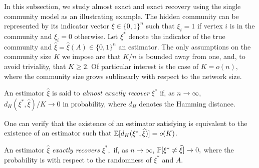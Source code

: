 In this subsection, we study almost exact and exact recovery using the single community model
as an illustrating example. The hidden community can be represented by its indicator vector $\xi \in \{0, 1\}^n$
such that $\xi_i=1$ if vertex $i$ is in the community and $\xi_i=0$ otherwise. 
Let $\xi^*$ denote the indicator of the true community 
and $\hat\xi=\hat\xi(A) \in \{0,1\}^n$ an estimator.
The only assumptions on the community size $K$ we impose are that $K/n$ is bounded away from one,
and, to avoid triviality, that $K\geq 2$.  Of particular interest is the case of  $K=o(n),$
where the community size grows sublinearly with respect to the network size.






\begin{definition}   \label{def:weak_recovery}
An estimator $\hat \xi$ is said to {\em almost exactly recover} $\xi^*$ if, as
$n \to \infty$,  $d_H(\xi^*, \hat\xi) / K \to 0$ in probability,  where $d_H$ denotes the Hamming distance.
\end{definition}

One can verify that the existence of an estimator satisfying  is equivalent to the existence of an estimator such that  $ \mathbb{E}[d_H(\xi^*, \widehat\xi)] = o(K)$. 
 

\begin{definition}
\label{def:exact}
An estimator $\hat \xi$ {\em exactly recovers} $\xi^*,$ if, 
as $n \to \infty$,
$
\mathbb{P}[\xi^* \neq \widehat\xi] \to 0,
$
where the probability is with respect to the randomness of $\xi^*$ and $A$.
\end{definition}

